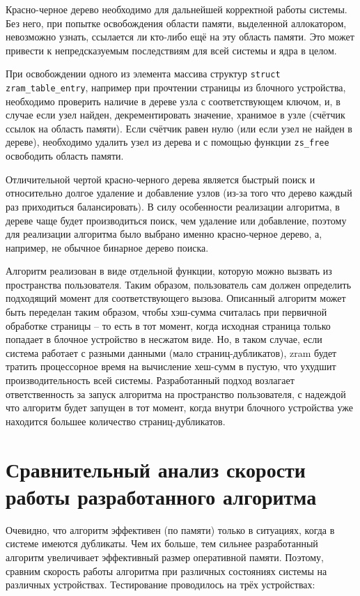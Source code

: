 \documentclass[12pt, a4paper]{article}
\begin{document}
Красно-черное дерево необходимо для дальнейшей корректной работы системы. Без него, при попытке освобождения области памяти, выделенной аллокатором, невозможно узнать, ссылается ли кто-либо ещё на эту область памяти. Это может привести к непредсказуемым последствиям для всей системы и ядра в целом. 

При освобождении одного из элемента массива структур \texttt{struct zram\_table\_entry}, например при прочтении страницы из блочного устройства, необходимо проверить наличие в дереве узла с соответствующем ключом, и, в случае если узел найден, декрементировать значение, хранимое в узле (счётчик ссылок на область памяти). Если счётчик равен нулю (или если узел не найден в дереве), необходимо удалить узел из дерева и с помощью функции \texttt{zs\_free} освободить область памяти.

Отличительной чертой красно-черного дерева является быстрый поиск и относительно долгое удаление и добавление узлов (из-за того что дерево каждый раз приходиться балансировать). В силу особенности реализации алгоритма, в дереве чаще будет производиться поиск, чем удаление или добавление, поэтому для реализации алгоритма было выбрано именно красно-черное дерево, а, например, не обычное бинарное дерево поиска.

Алгоритм реализован в виде отдельной функции, которую можно вызвать из пространства пользователя. Таким образом, пользователь сам должен определить подходящий момент для соответствующего вызова. Описанный алгоритм может быть переделан таким образом, чтобы хэш-сумма считалась при первичной обработке страницы -- то есть в тот момент, когда исходная страница только попадает в блочное устройство в несжатом виде. Но, в таком случае, если система работает с разными данными (мало страниц-дубликатов), zram будет тратить процессорное время на вычисление хеш-сумм в пустую, что ухудшит производительность всей системы. Разработанный подход возлагает ответственность за запуск алгоритма на пространство пользователя, с надеждой что алгоритм будет запущен в тот момент, когда внутри блочного устройства уже находится большее количество страниц-дубликатов.

\section{Сравнительный анализ скорости работы разработанного алгоритма}

Очевидно, что алгоритм эффективен (по памяти) только в ситуациях, когда в системе имеются дубликаты. Чем их больше, тем сильнее разработанный алгоритм увеличивает эффективный размер оперативной памяти. Поэтому, сравним скорость работы алгоритма при различных состояниях системы на различных устройствах. Тестирование проводилось на трёх устройствах:
\end{document}

